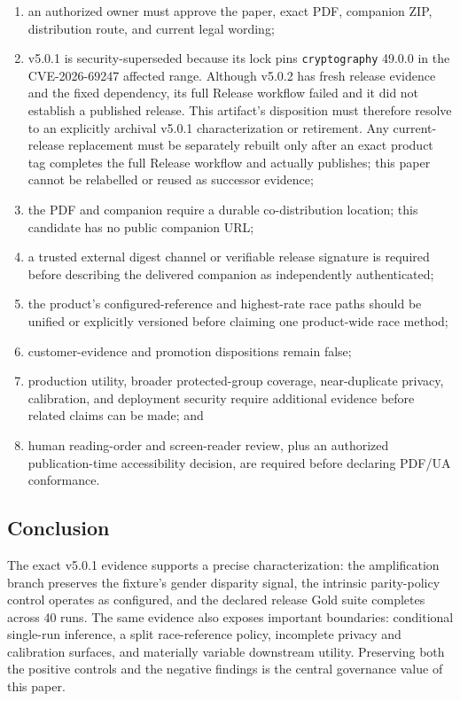 \begin{enumerate}
  \item an authorized owner must approve the paper, exact PDF, companion ZIP, distribution route,
        and current legal wording;
  \item v5.0.1 is security-superseded because its lock pins \texttt{cryptography} 49.0.0 in the
        CVE-2026-69247 affected range. Although v5.0.2 has fresh release evidence and the fixed
        dependency, its full Release workflow failed and it did not establish a published release.
        This artifact's disposition must therefore resolve to an explicitly archival v5.0.1
        characterization or retirement. Any current-release replacement must be separately rebuilt
        only after an exact product tag completes the full Release workflow and actually publishes;
        this paper cannot be relabelled or reused as successor evidence;
  \item the PDF and companion require a durable co-distribution location; this candidate has no
        public companion URL;
  \item a trusted external digest channel or verifiable release signature is required before
        describing the delivered companion as independently authenticated;
  \item the product's configured-reference and highest-rate race paths should be unified or
        explicitly versioned before claiming one product-wide race method;
  \item customer-evidence and promotion dispositions remain false;
  \item production utility, broader protected-group coverage, near-duplicate privacy, calibration,
        and deployment security require additional evidence before related claims can be made;
        and
  \item human reading-order and screen-reader review, plus an authorized publication-time
        accessibility decision, are required before declaring PDF/UA conformance.
\end{enumerate}

\subsection{Conclusion}

The exact v5.0.1 evidence supports a precise characterization: the amplification branch preserves
the fixture's gender disparity signal, the intrinsic parity-policy control operates as configured,
and the declared release Gold suite completes across 40 runs. The same evidence also exposes
important boundaries: conditional single-run inference, a split race-reference policy, incomplete
privacy and calibration surfaces, and materially variable downstream utility. Preserving both the
positive controls and the negative findings is the central governance value of this paper.
